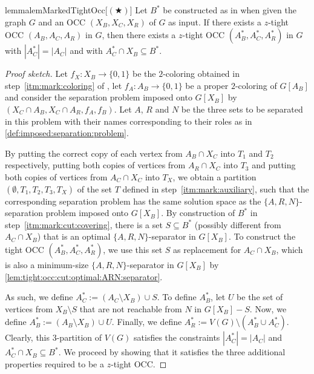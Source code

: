 %
%
\begin{restatable}{lemma}{lemMarkedTightOcc}[$(\bigstar)$] \label{lem:marked:tight:occ}
	Let $B^\ast$ be constructed as in  when given the graph $G$ and an OCC $(X_B, X_C, X_R)$ of $G$ as input. If there exists a $z$-tight OCC $(A_B, A_C, A_R)$ in $G$, then there exists a $z$-tight OCC $(A_B^\ast, A_C^\ast, A_R^\ast)$ in $G$ with $|A_C^\ast| = |A_C|$ and with $A_C^\ast \cap X_B \subseteq B^\ast$.
\end{restatable}
\begin{proof}[Proof sketch]
	Let $f_X \colon X_B \rightarrow \{0,1\}$ be the $2$-coloring obtained in step~\ref{itm:mark:coloring} of , let $f_A \colon A_B \rightarrow \{0,1\}$ be a proper $2$-coloring of $G[A_B]$ and consider the separation problem imposed onto $G[X_B]$ by ${(X_C \cap A_B, X_C \cap A_R, f_A, f_B)}$. Let $A$, $R$ and $N$ be the three sets to be separated in this problem with their names corresponding to their roles as in \cref{def:imposed:separation:problem}.
	
	By putting the correct copy of each vertex from $A_B \cap X_C$ into $T_1$ and $T_2$ respectively, putting both copies of vertices from $A_R \cap X_C$ into $T_3$ and putting both copies of vertices from $A_C \cap X_C$ into $T_X$, we obtain a partition $(\emptyset, T_1, T_2, T_3, T_X)$ of the set $T$ defined in step~\ref{itm:mark:auxiliary}, such that the corresponding separation problem has the same solution space as the $\{A, R, N\}$-separation problem imposed onto $G[X_B]$. By construction of $B^\ast$ in step~\ref{itm:mark:cut:covering}, there is a set $S \subseteq B^\ast$ (possibly different from $A_C \cap X_B$) that is an optimal $\{A, R, N\}$-separator in $G[X_B]$. To construct the tight OCC $(A_B^\ast, A_C^\ast, A_R^\ast)$, we use this set $S$ as replacement for $A_C \cap X_B$, which is also a minimum-size $\{A, R, N\}$-separator in $G[X_B]$ by \cref{lem:tight:occ:cut:optimal:ARN:separator}.

	As such, we define $A_C^\ast := (A_C \setminus X_B) \cup S$. To define $A_B^\ast$, let $U$ be the set of vertices from $X_B \setminus S$ that are not reachable from $N$ in $G[X_B] - S$. Now, we define $A_B^\ast := (A_B \setminus X_B) \cup U$. Finally, we define $A_R^\ast := V(G) \setminus (A_B^\ast \cup A_C^\ast)$. Clearly, this $3$-partition of $V(G)$ satisfies the constraints $|A_C^\ast| = |A_C|$ and $A_C^\ast \cap X_B \subseteq B^\ast$. We proceed by showing that it satisfies the three additional properties required to be a $z$-tight OCC.
	

\end{proof}

